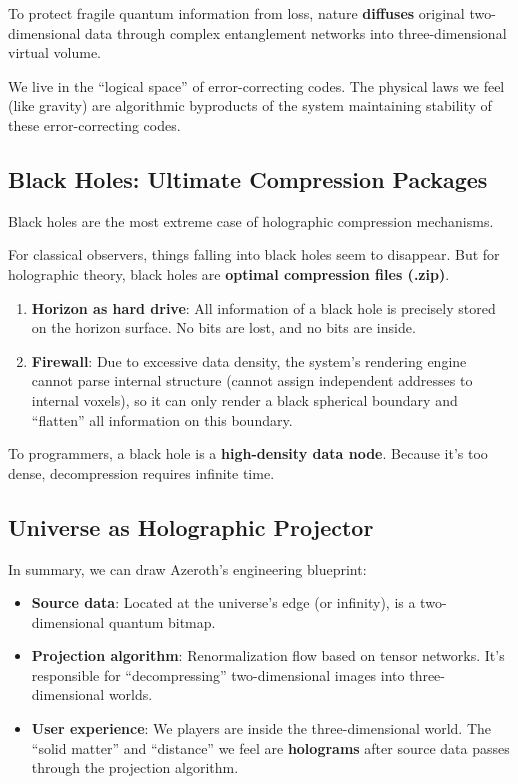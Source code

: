 To protect fragile quantum information from loss, nature \textbf{diffuses} original two-dimensional data through complex entanglement networks into three-dimensional virtual volume.

We live in the ``logical space'' of error-correcting codes. The physical laws we feel (like gravity) are algorithmic byproducts of the system maintaining stability of these error-correcting codes.

\subsection{Black Holes: Ultimate Compression Packages}

Black holes are the most extreme case of holographic compression mechanisms.

For classical observers, things falling into black holes seem to disappear. But for holographic theory, black holes are \textbf{optimal compression files (.zip)}.

\begin{enumerate}
\item \textbf{Horizon as hard drive}: All information of a black hole is precisely stored on the horizon surface. No bits are lost, and no bits are inside.
\item \textbf{Firewall}: Due to excessive data density, the system's rendering engine cannot parse internal structure (cannot assign independent addresses to internal voxels), so it can only render a black spherical boundary and ``flatten'' all information on this boundary.
\end{enumerate}

To programmers, a black hole is a \textbf{high-density data node}. Because it's too dense, decompression requires infinite time.

\subsection{Universe as Holographic Projector}

In summary, we can draw Azeroth's engineering blueprint:

\begin{itemize}
\item \textbf{Source data}: Located at the universe's edge (or infinity), is a two-dimensional quantum bitmap.
\item \textbf{Projection algorithm}: Renormalization flow based on tensor networks. It's responsible for ``decompressing'' two-dimensional images into three-dimensional worlds.
\item \textbf{User experience}: We players are inside the three-dimensional world. The ``solid matter'' and ``distance'' we feel are \textbf{holograms} after source data passes through the projection algorithm.
\end{itemize}

